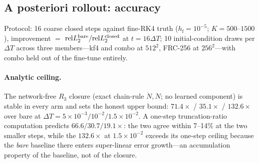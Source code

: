 \documentclass[11pt]{article}
\theoremstyle{plain}
\theoremstyle{definition}
\newcommand{\Ndot}{\dot{N}}
\newcommand{\Nddot}{\ddot{N}}
\newcommand{\DT}{\Delta T}
\newcommand{\hf}{h_{\mathrm{f}}}
\begin{document}
\subsection{A posteriori rollout: accuracy}
\label{sec:results-apost}
Protocol: 16 coarse closed steps against fine-RK4 truth
($\hf=10^{-5}$; $K=500$--$1500$), improvement $=$
$\mathrm{rel}L_2^{\rm bare}/\mathrm{rel}L_2^{\rm closed}$ at $t=16\DT$; 10
initial-condition draws per $\DT$ across three members---kf4 and combo at
$512^2$, FRC-256 at $256^2$---with combo held out of the fine-tune entirely.

\paragraph{Analytic ceiling.}
The network-free $R_3$ closure (exact chain-rule $\Ndot,\Nddot$; no learned
component) is stable in every arm and sets the honest upper bound:
$71.4\times$ / $35.1\times$ / $132.6\times$ over bare at
$\DT=5\times10^{-3}/10^{-2}/1.5\times10^{-2}$. A one-step
truncation-ratio computation predicts $66.6/30.7/19.1\times$: the two agree
within 7--14\% at the two smaller steps, while the $132.6\times$ at
$1.5\times10^{-2}$ exceeds its one-step ceiling because the \emph{bare}
baseline there enters super-linear error growth---an accumulation property of
the baseline, not of the closure.
\end{document}
